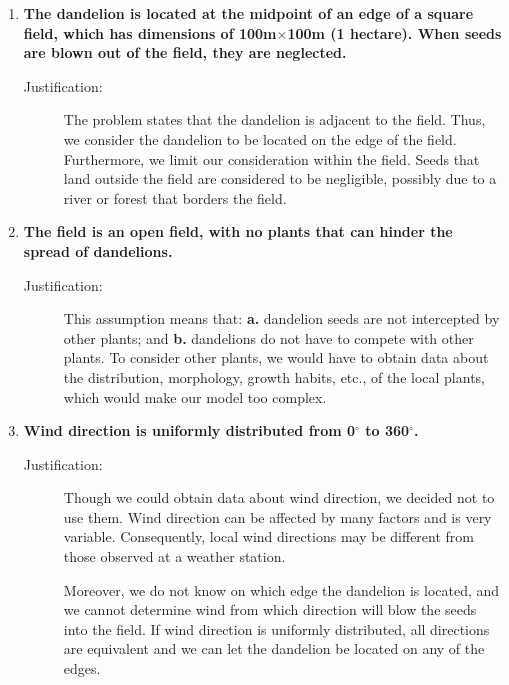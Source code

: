 \documentclass[12pt]{article}
\begin{document}
		\begin{enumerate}
			
			\item \textbf{The dandelion is located at the midpoint of an edge of a square field, which has dimensions of 100m$\times$100m (1 hectare).  When seeds are blown out of the field, they are neglected.}
			\vspace{-0.125in}
			\begin{description}
				\item[Justification:] The problem states that the dandelion is adjacent to the field.  Thus, we consider the dandelion to be located on the edge of the field.  Furthermore, we limit our consideration within the field.  Seeds that land outside the field are considered to be negligible, possibly due to a river or forest that borders the field.
			\end{description}
			
			\item \textbf{The field is an open field, with no plants that can hinder the spread of dandelions.}
			\vspace{-0.125in}
			\begin{description}
				\item[Justification:] This assumption means that: \textbf{a.} dandelion seeds are not intercepted by other plants; and \textbf{b.} dandelions do not have to compete with other plants.  To consider other plants, we would have to obtain data about the distribution, morphology, growth habits, etc., of the local plants, which would make our model too complex.
			\end{description}
			
			\item \textbf{Wind direction is uniformly distributed from 0$^\circ$ to 360$^\circ$.}
			\vspace{-0.125in}
			\begin{description}
				\item[Justification:] Though we could obtain data about wind direction, we decided not to use them.  Wind direction can be affected by many factors and is very variable.  Consequently, local wind directions may be different from those observed at a weather station.
				
				Moreover, we do not know on which edge the dandelion is located, and we cannot determine wind from which direction will blow the seeds into the field.  If wind direction is uniformly distributed, all directions are equivalent and we can let the dandelion be located on any of the edges.
			\end{description}
			

\end{enumerate}
\end{document}
